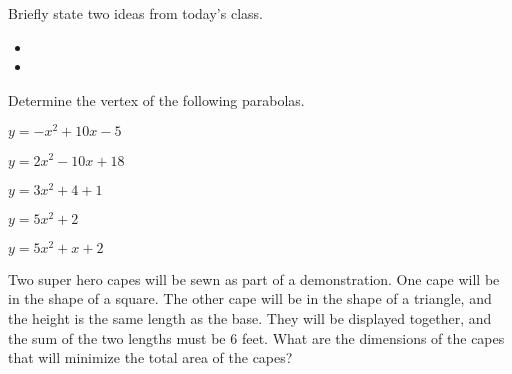 \postClass

\begin{problem}
\item Briefly state two ideas from today's class.
  \begin{itemize}
  \item 
  \item 
  \end{itemize}

\item Determine the vertex of the following parabolas.
  \begin{subproblem}
  \item $y=-x^2+10x-5$
  \item $y=2x^2-10x+18$
  \item $y=3x^2+4+1$
  \item $y=5x^2+2$
  \item $y=5x^2+x+2$
  \end{subproblem}

\item Two super hero capes will be sewn as part of a
  demonstration. One cape will be in the shape of a square. The other
  cape will be in the shape of a triangle, and the height is the same
  length as the base. They will be displayed together, and the sum of
  the two lengths must be 6 feet. What are the dimensions of the capes
  that will minimize the total area of the capes?
\end{problem}



